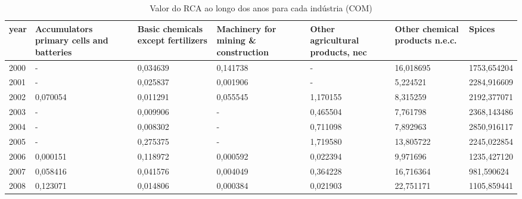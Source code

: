 \begin{table}
\centering
\caption{Valor do RCA ao longo dos anos para cada indústria (COM)}
\begin{tabular}{p{1cm}p{2cm}p{2cm}p{2cm}p{2cm}p{2cm}p{2cm}}
\toprule
 year &  Accumulators primary cells and batteries &  Basic chemicals except fertilizers &  Machinery for mining \& construction &  Other agricultural products, nec &  Other chemical products n.e.c. &      Spices \\
\midrule
 2000 &                                         - &                            0,034639 &                             0,141738 &                                 - &                       16,018695 & 1753,654204 \\
 2001 &                                         - &                            0,025837 &                             0,001906 &                                 - &                        5,224521 & 2284,916609 \\
 2002 &                                  0,070054 &                            0,011291 &                             0,055545 &                          1,170155 &                        8,315259 & 2192,377071 \\
 2003 &                                         - &                            0,009906 &                                    - &                          0,465504 &                        7,761798 & 2368,143486 \\
 2004 &                                         - &                            0,008302 &                                    - &                          0,711098 &                        7,892963 & 2850,916117 \\
 2005 &                                         - &                            0,275375 &                                    - &                          1,719580 &                       13,805722 & 2245,022854 \\
 2006 &                                  0,000151 &                            0,118972 &                             0,000592 &                          0,022394 &                        9,971696 & 1235,427120 \\
 2007 &                                  0,058416 &                            0,041576 &                             0,004049 &                          0,364228 &                       16,716364 &  981,590624 \\
 2008 &                                  0,123071 &                            0,014806 &                             0,000384 &                          0,021903 &                       22,751171 & 1105,859441 \\

\end{tabular}
\end{table}

